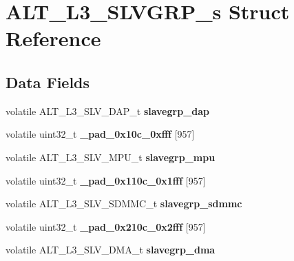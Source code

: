 \hypertarget{structALT__L3__SLVGRP__s}{}\section{A\+L\+T\+\_\+\+L3\+\_\+\+S\+L\+V\+G\+R\+P\+\_\+s Struct Reference}
\label{structALT__L3__SLVGRP__s}
\subsection*{Data Fields}
\begin{DoxyCompactItemize}
\item 
\mbox{\label{structALT__L3__SLVGRP__s_a90eccc28949aefc9f7c6e4ae64121bf3}} 
volatile A\+L\+T\+\_\+\+L3\+\_\+\+S\+L\+V\+\_\+\+D\+A\+P\+\_\+t {\bfseries slavegrp\+\_\+dap}
\item 
\mbox{\label{structALT__L3__SLVGRP__s_a834c92950dae635d48f200bd52d4846c}} 
volatile uint32\+\_\+t {\bfseries \+\_\+pad\+\_\+0x10c\+\_\+0xfff} \mbox{[}957\mbox{]}
\item 
\mbox{\label{structALT__L3__SLVGRP__s_afb3be2ad77d83031071a1643a0dc6873}} 
volatile A\+L\+T\+\_\+\+L3\+\_\+\+S\+L\+V\+\_\+\+M\+P\+U\+\_\+t {\bfseries slavegrp\+\_\+mpu}
\item 
\mbox{\label{structALT__L3__SLVGRP__s_a9be80fd1faad2669cd748a79de937b7b}} 
volatile uint32\+\_\+t {\bfseries \+\_\+pad\+\_\+0x110c\+\_\+0x1fff} \mbox{[}957\mbox{]}
\item 
\mbox{\label{structALT__L3__SLVGRP__s_ae1bf310ff35fcd950c3a6bbf40b14368}} 
volatile A\+L\+T\+\_\+\+L3\+\_\+\+S\+L\+V\+\_\+\+S\+D\+M\+M\+C\+\_\+t {\bfseries slavegrp\+\_\+sdmmc}
\item 
\mbox{\label{structALT__L3__SLVGRP__s_a79ca96d52c9eea0acad91806cf3b2007}} 
volatile uint32\+\_\+t {\bfseries \+\_\+pad\+\_\+0x210c\+\_\+0x2fff} \mbox{[}957\mbox{]}
\item 
\mbox{\label{structALT__L3__SLVGRP__s_a5628923c288a5cf3cf51a01bbb9c8831}} 
volatile A\+L\+T\+\_\+\+L3\+\_\+\+S\+L\+V\+\_\+\+D\+M\+A\+\_\+t {\bfseries slavegrp\+\_\+dma}

\end{DoxyCompactItemize}
